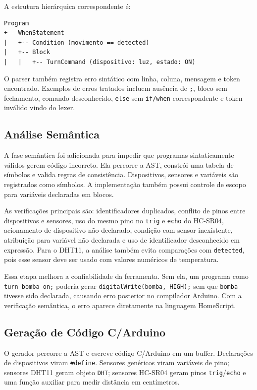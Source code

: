 \documentclass[conference]{IEEEtran}
\begin{document}
A estrutura hierárquica correspondente é:

\begin{lstlisting}[basicstyle=\ttfamily\scriptsize,frame=single,breaklines=true]
Program
+-- WhenStatement
|   +-- Condition (movimento == detected)
|   +-- Block
|   |   +-- TurnCommand (dispositivo: luz, estado: ON)
\end{lstlisting}

O parser também registra erro sintático com linha, coluna, mensagem e token encontrado. Exemplos de erros tratados incluem ausência de \texttt{;}, bloco sem fechamento, comando desconhecido, \texttt{else} sem \texttt{if/when} correspondente e token inválido vindo do lexer.

\subsection{Análise Semântica}

A fase semântica foi adicionada para impedir que programas sintaticamente válidos gerem código incorreto. Ela percorre a AST, constrói uma tabela de símbolos e valida regras de consistência. Dispositivos, sensores e variáveis são registrados como símbolos. A implementação também possui controle de escopo para variáveis declaradas em blocos.

As verificações principais são: identificadores duplicados, conflito de pinos entre dispositivos e sensores, uso do mesmo pino no \texttt{trig} e \texttt{echo} do HC-SR04, acionamento de dispositivo não declarado, condição com sensor inexistente, atribuição para variável não declarada e uso de identificador desconhecido em expressão. Para o DHT11, a análise também evita comparações com \texttt{detected}, pois esse sensor deve ser usado com valores numéricos de temperatura.

Essa etapa melhora a confiabilidade da ferramenta. Sem ela, um programa como \texttt{turn bomba on;} poderia gerar \texttt{digitalWrite(bomba, HIGH);} sem que \texttt{bomba} tivesse sido declarada, causando erro posterior no compilador Arduino. Com a verificação semântica, o erro aparece diretamente na linguagem HomeScript.

\subsection{Geração de Código C/Arduino}

O gerador percorre a AST e escreve código C/Arduino em um buffer. Declarações de dispositivos viram \texttt{\#define}. Sensores genéricos viram variáveis de pino; sensores DHT11 geram objeto \texttt{DHT}; sensores HC-SR04 geram pinos \texttt{trig}/\texttt{echo} e uma função auxiliar para medir distância em centímetros.
\end{document}
